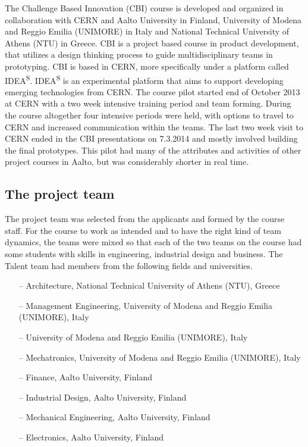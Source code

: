 \documentclass[english,12pt,a4paper,dvips]{article}
\begin{document}
The Challenge Based Innovation (CBI) course is developed and organized in collaboration with CERN and Aalto University in Finland, University of Modena and Reggio Emilia (UNIMORE) in Italy and National Technical University of Athens (NTU) in Greece. CBI is a project based course in product development, that utilizes a design thinking process to guide multidisciplinary teams in prototyping. CBI is based in CERN, more specifically under a platform called IDEA\textsuperscript{S}. IDEA\textsuperscript{S} is an experimental platform that aims to support developing emerging technologies from CERN. The course pilot started end of October 2013 at CERN with a two week intensive training period and team forming. During the course altogether four intensive periods were held, with options to travel to CERN and increased communication within the teams. The last two week visit to CERN ended in the CBI presentations on 7.3.2014 and mostly involved building the final prototypes. This pilot had many of the attributes and activities of other project courses in Aalto, but was considerably shorter in real time.

\subsection{The project team}

The project team was selected from the applicants and formed by the course staff. For the course to work as intended and to have the right kind of team dynamics, the teams were mixed so that each of the two teams on the course had some students with skills in engineering, industrial design and business. The Talent team had members from the following fields and universities.

\begin{itemize}
\item[--] Architecture, National Technical University of Athens (NTU), Greece
\item[--] Management Engineering, University of Modena and Reggio Emilia (UNIMORE), Italy
\item[--] University of Modena and Reggio Emilia (UNIMORE), Italy
\item[--] Mechatronics, University of Modena and Reggio Emilia (UNIMORE), Italy
\item[--] Finance, Aalto University, Finland
\item[--] Industrial Design, Aalto University, Finland
\item[--] Mechanical Engineering, Aalto University, Finland
\item[--] Electronics, Aalto University, Finland
\end{itemize}
\end{document}
